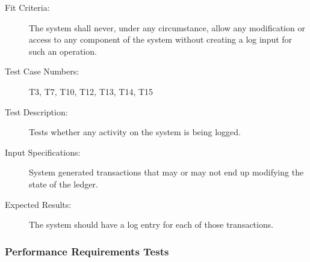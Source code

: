 \documentclass[a4paper,twoside,phd]{BYUPhys}
\begin{document}
\begin{description}
\item[Fit Criteria:] The system shall never, under any circumstance, allow any modification or access to any component of the system without creating a log input for such an operation.
\item[Test Case Numbers:] T3, T7, T10, T12, T13, T14, T15
\item[Test Description:] Tests whether any activity on the system is being logged.
\item[Input Specifications:] System generated transactions that may or may not end up modifying the state of the ledger.
\item[Expected Results:] The system should have a log entry for each of those transactions.
\end{description}
\subsubsection{Performance Requirements Tests}
\end{document}
